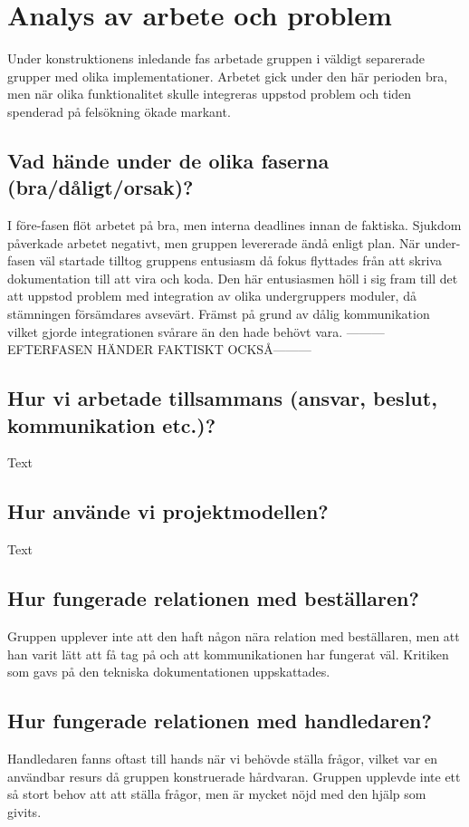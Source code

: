 \documentclass{article}
\begin{document}
\clearpage
\section{Analys av arbete och problem}
Under konstruktionens inledande fas arbetade gruppen i väldigt separerade grupper med olika implementationer. Arbetet gick under den här perioden bra, men när olika funktionalitet skulle integreras uppstod problem och tiden spenderad på felsökning ökade markant. 

\subsection{Vad hände under de olika faserna (bra/dåligt/orsak)?}
I före-fasen flöt arbetet på bra, men interna deadlines innan de faktiska. Sjukdom påverkade arbetet negativt, men gruppen levererade ändå enligt plan. När under-fasen väl startade tilltog gruppens entusiasm då fokus flyttades från att skriva dokumentation till att vira och koda. Den här entusiasmen höll i sig fram till det att uppstod problem med integration av olika undergruppers moduler, då stämningen försämdares avsevärt. Främst på grund av dålig kommunikation vilket gjorde integrationen svårare än den hade behövt vara. 
---------EFTERFASEN HÄNDER FAKTISKT OCKSÅ---------

\subsection{Hur vi arbetade tillsammans (ansvar, beslut, kommunikation etc.)?}
Text

\subsection{Hur använde vi projektmodellen?}
Text

\subsection{Hur fungerade relationen med beställaren?}
Gruppen upplever inte att den haft någon nära relation med beställaren, men att han varit lätt att få tag på och att kommunikationen har fungerat väl. Kritiken som gavs på den tekniska dokumentationen uppskattades. 

\subsection{Hur fungerade relationen med handledaren?}
Handledaren fanns oftast till hands när vi behövde ställa frågor, vilket var en användbar resurs då gruppen konstruerade hårdvaran. Gruppen upplevde inte ett så stort behov att att ställa frågor, men är mycket nöjd med den hjälp som givits.
\end{document}
